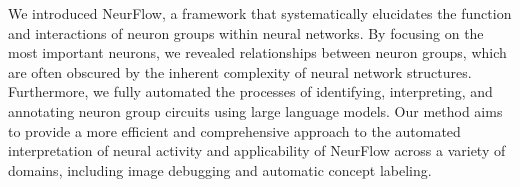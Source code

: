 We introduced NeurFlow, a framework that systematically elucidates the function and interactions of neuron groups within neural networks. By focusing on the most important neurons, we revealed relationships between neuron groups,  which are often obscured by the inherent complexity of neural network structures. Furthermore, we fully automated the processes of identifying, interpreting, and annotating neuron group circuits using large language models.
Our method aims to provide a more efficient and comprehensive approach to the automated interpretation of neural activity and applicability of NeurFlow across a variety of domains, including image debugging and automatic concept labeling.